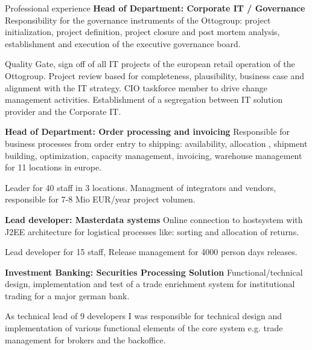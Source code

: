 \begin{rubric}{Professional experience}
\pagebreak
{}
\entry*[08/2009 - 10/2011] \textbf{Head of Department: Corporate IT / Governance}\newline
{} 
Responsibility for the governance instruments of the Ottogroup: project initialization, project definition, project closure and post mortem analysis, establishment and execution of the executive governance board.\axelvspace

Quality Gate, sign off of all IT projects of the european retail operation of the Ottogroup. Project review based for completeness, plausibility, business case and alignment with the IT strategy. CIO taskforce member to drive change management activities. Establishment of a segregation between IT solution provider and the Corporate IT.

\entry*[08/2006 - 07/2009] \textbf{Head of Department: Order processing and invoicing}\newline
{} 
Responsible for business processes from order entry to shipping: availability, allocation , shipment building, optimization, capacity management, invoicing, warehouse management for 11 locations in europe.\axelvspace

Leader for 40 staff in 3 locations. Managment of integrators and vendors, responsible for 7-8 Mio EUR/year project volumen.

\entry*[01/2005 - 07/2006] \textbf{Lead developer: Masterdata systems}\newline
{} 
Online connection to hostsystem with J2EE architecture for logistical processes like: sorting and allocation of returns.\axelvspace

Lead developer for 15 staff, Release management for 4000 person days releases.

\entry*[10/2003 - 12/2004] \textbf{Investment Banking: Securities Processing Solution}\newline
{} 
Functional/technical design, implementation and test of a trade enrichment system for institutional trading for a major german bank.\axelvspace

As technical lead of 9 developers I was responsible for technical design and implementation of various functional elements of the core system e.g. trade management for brokers and the backoffice. 


\end{rubric}
